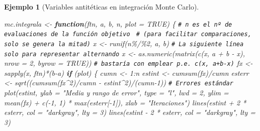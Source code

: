 \documentclass[
]{book}
\newenvironment{Shaded}{\begin{snugshade}}{\end{snugshade}}
\newcommand{\AttributeTok}[1]{\textcolor[rgb]{0.77,0.63,0.00}{#1}}
\newcommand{\CommentTok}[1]{\textcolor[rgb]{0.56,0.35,0.01}{\textit{#1}}}
\newcommand{\ConstantTok}[1]{\textcolor[rgb]{0.00,0.00,0.00}{#1}}
\newcommand{\ControlFlowTok}[1]{\textcolor[rgb]{0.13,0.29,0.53}{\textbf{#1}}}
\newcommand{\DecValTok}[1]{\textcolor[rgb]{0.00,0.00,0.81}{#1}}
\newcommand{\FunctionTok}[1]{\textcolor[rgb]{0.00,0.00,0.00}{#1}}
\newcommand{\NormalTok}[1]{#1}
\newcommand{\OtherTok}[1]{\textcolor[rgb]{0.56,0.35,0.01}{#1}}
\newcommand{\SpecialCharTok}[1]{\textcolor[rgb]{0.00,0.00,0.00}{#1}}
\newcommand{\StringTok}[1]{\textcolor[rgb]{0.31,0.60,0.02}{#1}}
\theoremstyle{break}
\newtheorem{example}{Ejemplo}[chapter]
\theoremstyle{nonumberplain}
\renewcommand{\CommentTok}[1]{\textcolor[rgb]{0.41,0.41,0.41}{\texttt{#1}}}
\begin{document}
\begin{example}[Variables antitéticas en integración Monte Carlo]
\begin{Shaded}
\begin{Highlighting}[]
\NormalTok{mc.integrala }\OtherTok{\textless{}{-}} \ControlFlowTok{function}\NormalTok{(ftn, a, b, n, }\AttributeTok{plot =} \ConstantTok{TRUE}\NormalTok{) \{}
  \CommentTok{\# n es el nº de evaluaciones de la función objetivo }
  \CommentTok{\# (para facilitar comparaciones, solo se genera la mitad)}
\NormalTok{  x }\OtherTok{\textless{}{-}} \FunctionTok{runif}\NormalTok{(n}\SpecialCharTok{\%/\%}\DecValTok{2}\NormalTok{, a, b)}
  \CommentTok{\# La siguiente línea solo para representar alternando}
\NormalTok{  x }\OtherTok{\textless{}{-}} \FunctionTok{as.numeric}\NormalTok{(}\FunctionTok{matrix}\NormalTok{(}\FunctionTok{c}\NormalTok{(x, a }\SpecialCharTok{+}\NormalTok{ b }\SpecialCharTok{{-}}\NormalTok{ x), }\AttributeTok{nrow =} \DecValTok{2}\NormalTok{, }\AttributeTok{byrow =} \ConstantTok{TRUE}\NormalTok{))}
  \CommentTok{\# bastaría con emplear p.e. c(x, a+b{-}x)}
\NormalTok{  fx }\OtherTok{\textless{}{-}} \FunctionTok{sapply}\NormalTok{(x, ftn)}\SpecialCharTok{*}\NormalTok{(b}\SpecialCharTok{{-}}\NormalTok{a)}
  \ControlFlowTok{if}\NormalTok{ (plot) \{}
\NormalTok{    cumn }\OtherTok{\textless{}{-}} \DecValTok{1}\SpecialCharTok{:}\NormalTok{n}
\NormalTok{    estint }\OtherTok{\textless{}{-}} \FunctionTok{cumsum}\NormalTok{(fx)}\SpecialCharTok{/}\NormalTok{cumn}
\NormalTok{    esterr }\OtherTok{\textless{}{-}} \FunctionTok{sqrt}\NormalTok{((}\FunctionTok{cumsum}\NormalTok{(fx}\SpecialCharTok{\^{}}\DecValTok{2}\NormalTok{)}\SpecialCharTok{/}\NormalTok{cumn }\SpecialCharTok{{-}}\NormalTok{ estint}\SpecialCharTok{\^{}}\DecValTok{2}\NormalTok{)}\SpecialCharTok{/}\NormalTok{(cumn}\DecValTok{{-}1}\NormalTok{)) }\CommentTok{\# Errores estándar}
    \FunctionTok{plot}\NormalTok{(estint, }\AttributeTok{ylab =} \StringTok{"Media y rango de error"}\NormalTok{, }\AttributeTok{type =} \StringTok{"l"}\NormalTok{, }\AttributeTok{lwd =} \DecValTok{2}\NormalTok{, }
         \AttributeTok{ylim =} \FunctionTok{mean}\NormalTok{(fx) }\SpecialCharTok{+} \FunctionTok{c}\NormalTok{(}\SpecialCharTok{{-}}\DecValTok{1}\NormalTok{, }\DecValTok{1}\NormalTok{) }\SpecialCharTok{*} \FunctionTok{max}\NormalTok{(esterr[}\SpecialCharTok{{-}}\DecValTok{1}\NormalTok{]), }\AttributeTok{xlab =} \StringTok{"Iteraciones"}\NormalTok{)}
    \FunctionTok{lines}\NormalTok{(estint }\SpecialCharTok{+} \DecValTok{2} \SpecialCharTok{*}\NormalTok{ esterr, }\AttributeTok{col =} \StringTok{"darkgray"}\NormalTok{, }\AttributeTok{lty =} \DecValTok{3}\NormalTok{)}
    \FunctionTok{lines}\NormalTok{(estint }\SpecialCharTok{{-}} \DecValTok{2} \SpecialCharTok{*}\NormalTok{ esterr, }\AttributeTok{col =} \StringTok{"darkgray"}\NormalTok{, }\AttributeTok{lty =} \DecValTok{3}\NormalTok{)}

\end{Highlighting}
\end{Shaded}
\end{example}
\end{document}
